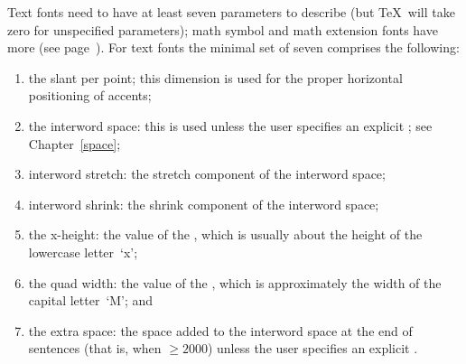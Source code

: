 Text fonts need to have at least seven  parameters
to describe 
(but \TeX\ will take zero for unspecified parameters);
math symbol and math extension fonts have more
(see page~\pageref{fam23:fontdims}).
For text fonts the minimal set of seven comprises the following:
\begin{enumerate} \item the slant per point; this dimension is used
    for the proper horizontal positioning of accents;
\item the interword space: this is used unless the user
    specifies an explicit ;
    see Chapter~\ref{space};
\item interword stretch: the stretch component of the interword
    space;
\item interword shrink: the shrink component of
    the interword space;
\item the x-height: the value of
    the  , which is usually about the
    height of the lowercase letter~`x'; 
\item the quad width:
    the value of the  , which is
    approximately the width of the capital letter~`M'; and
\item the extra space: the space added to the interword space
at the end of sentences (that is, when ${}\geq2000$)
unless the user specifies an explicit .
\end{enumerate}

